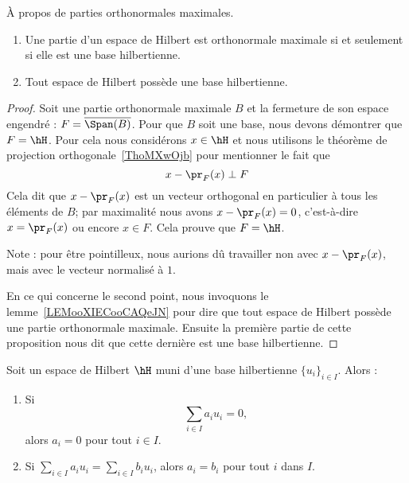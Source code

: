 \begin{proposition}      \label{PROPooLDXFooRaxBsI}
	À propos de parties orthonormales maximales.
	\begin{enumerate}
		\item           \label{ITEMooVUFXooDrVwum}
		      Une partie d'un espace de Hilbert est orthonormale maximale si et seulement si elle est une base hilbertienne.
		\item       \label{ITEMooZFENooQnSlrv}
		      Tout espace de Hilbert possède une base hilbertienne.
	\end{enumerate}
\end{proposition}

\begin{proof}
	Soit une partie orthonormale maximale \( B\) et la fermeture de son espace engendré : \( F=\overline{ \Span(B) }\). Pour que \( B\) soit une base, nous devons démontrer que \( F=\hH\). Pour cela nous considérons \( x\in \hH\) et nous utilisons le théorème de projection orthogonale~\ref{ThoMXwOjb} pour mentionner le fait que
	\begin{equation}
		x-\pr_F(x)\perp F
	\end{equation}
	Cela dit que \( x-\pr_F(x)\) est un vecteur orthogonal en particulier à tous les éléments de \( B\); par maximalité nous avons \( x-\pr_F(x)=0\), c'est-à-dire \( x=\pr_F(x)\) ou encore \( x\in F\). Cela prouve que \( F=\hH\).

	Note : pour être pointilleux, nous aurions dû travailler non avec \( x-\pr_F(x)\), mais avec le vecteur normalisé à \( 1\).

	En ce qui concerne le second point, nous invoquons le lemme~\ref{LEMooXIECooCAQeJN} pour dire que tout espace de Hilbert possède une partie orthonormale maximale. Ensuite la première partie de cette proposition nous dit que cette dernière est une base hilbertienne.
\end{proof}

\begin{proposition}        \label{PROPooEYRSooCRPjdK}
	Soit un espace de Hilbert \( \hH\) muni d'une base hilbertienne \( \{ u_i \}_{i\in I}\). Alors :
	\begin{enumerate}
		\item
		      Si
		      \begin{equation}
			      \sum_{i\in I}a_iu_i=0,
		      \end{equation}
		      alors \( a_i=0\) pour tout \( i\in I\).
		\item
		      Si \( \sum_{i\in I}a_iu_i=\sum_{i\in I}b_iu_i\), alors \( a_i=b_i\) pour tout \( i\) dans \( I\).
	\end{enumerate}
\end{proposition}

